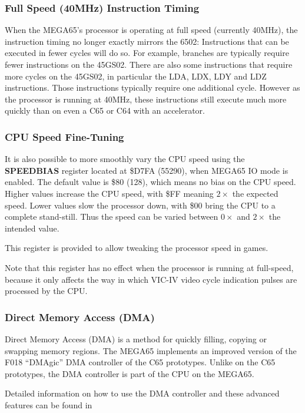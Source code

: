 \subsubsection{Full Speed (40MHz) Instruction Timing}

When the MEGA65's processor is operating at full speed
(currently 40MHz), the instruction
timing no longer exactly mirrors the 6502: Instructions that can be
executed in fewer cycles
will do so. For example, branches are typically require fewer instructions on the 45GS02.
There are also some instructions that require more cycles on the 45GS02, in particular the
LDA, LDX, LDY and LDZ instructions. Those instructions typically require one additional cycle.
However as the processor is running at 40MHz, these instructions still execute much more quickly
than on even a C65 or C64 with an accelerator.

\subsubsection{CPU Speed Fine-Tuning}
It is also possible to more smoothly
vary the CPU speed using the {\bf SPEEDBIAS} register located at \$D7FA (55290), when MEGA65 IO mode
is enabled.  The default value is \$80 (128), which means no bias on the CPU speed.  Higher values
increase the CPU speed, with \$FF meaning $2\times$ the expected speed. Lower values slow
the processor down, with \$00 bring the CPU to a complete stand-still.  Thus the speed can be
varied between $0\times$ and $2\times$ the intended value.

This register is provided to allow tweaking the processor speed in games.

Note that this register has no effect when
the processor is running at full-speed, because it only affects the way in which VIC-IV
video cycle indication pulses are processed by the CPU.

\subsubsection{Direct Memory Access (DMA)}
Direct Memory Access (DMA) is a method for quickly filling, copying or swapping memory regions.
The MEGA65 implements an improved version of the F018 ``DMAgic'' DMA controller of the C65 prototypes.
 Unlike on the C65 prototypes, the DMA controller is part of the CPU on the MEGA65.

Detailed information on how to use the DMA controller and these advanced features can be found in 

